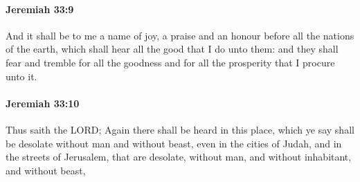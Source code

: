 		\paragraph{Jeremiah 33:9} %
			\label{JEREMIAH-33-9}

			And it shall be to me a name of joy, a praise and an honour before all the nations of the earth, which shall hear all the good that I do unto them: and they shall fear and tremble for all the goodness and for all the prosperity that I procure unto it.


		\paragraph{Jeremiah 33:10} %
			\label{JEREMIAH-33-10}

			Thus saith the LORD; Again there shall be heard in this place, which ye say shall be desolate without man and without beast, even in the cities of Judah, and in the streets of Jerusalem, that are desolate, without man, and without inhabitant, and without beast,

